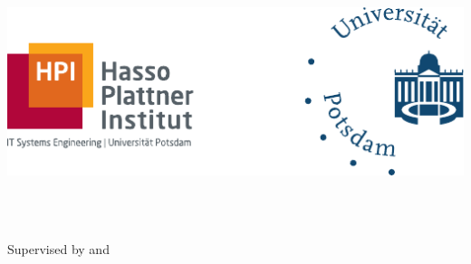 \begin{titlepage}
	\begin{addmargin}[-1cm]{-3cm}
    \begin{center}
        \large  

        \hfill

        \vfill

        \begingroup
            \color{Maroon}\spacedallcaps{\myTitle} \\ \bigskip
            \color{Maroon}\spacedallcaps{\myGermanTitle}\\ 
            \bigskip
        \endgroup

        \spacedlowsmallcaps{\myName}

        \vfill

        \includegraphics{TitleImages/university_logos.pdf} \\ \vspace*{1.5cm}

        \mySubtitle \\ \medskip   
        \myDegree \\ \bigskip
        
        Supervised by \mySupervisor and \myProf \\ \medskip
        \myDepartment \\                            
        \myFaculty \\
        \myUni \\ \bigskip

        \myTime

        \vfill   

    \end{center}  
  \end{addmargin}
  
    \newpage 
    \thispagestyle{empty}
    \quad 
    \newpage
\end{titlepage}   
